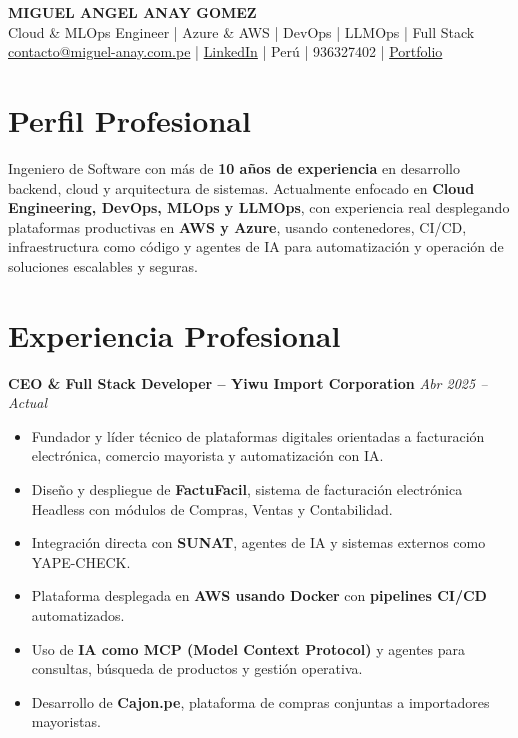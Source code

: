 \documentclass[11pt,a4paper]{article}
\begin{document}
\begin{center}
{\Large \textbf{MIGUEL ANGEL ANAY GOMEZ}}\\
Cloud \& MLOps Engineer | Azure \& AWS | DevOps | LLMOps | Full Stack\\
\vspace{4pt}
\href{mailto:contacto@miguel-anay.nom.pe}{contacto@miguel-anay.com.pe} |
\href{https://www.linkedin.com/in/miguel-anay}{LinkedIn} |
Perú
|
{936327402} |
\href{https:/portfolio.miguel-anay.nom.pe}{Portfolio} 
\end{center}

\vspace{6pt}

\section*{Perfil Profesional}

Ingeniero de Software con más de \textbf{10 años de experiencia} en desarrollo backend, cloud y arquitectura de sistemas.  
Actualmente enfocado en \textbf{Cloud Engineering, DevOps, MLOps y LLMOps}, con experiencia real desplegando plataformas productivas en \textbf{AWS y Azure}, usando contenedores, CI/CD, infraestructura como código y agentes de IA para automatización y operación de soluciones escalables y seguras.

\vspace{6pt}

\section*{Experiencia Profesional}

\textbf{CEO \& Full Stack Developer – Yiwu Import Corporation} \hfill \textit{Abr 2025 – Actual}
\begin{itemize}[leftmargin=*]
  \item Fundador y líder técnico de plataformas digitales orientadas a facturación electrónica, comercio mayorista y automatización con IA.
  \item Diseño y despliegue de \textbf{FactuFacil}, sistema de facturación electrónica Headless con módulos de Compras, Ventas y Contabilidad.
  \item Integración directa con \textbf{SUNAT}, agentes de IA y sistemas externos como YAPE-CHECK.
  \item Plataforma desplegada en \textbf{AWS usando Docker} con \textbf{pipelines CI/CD} automatizados.
  \item Uso de \textbf{IA como MCP (Model Context Protocol)} y agentes para consultas, búsqueda de productos y gestión operativa.
  \item Desarrollo de \textbf{Cajon.pe}, plataforma de compras conjuntas a importadores mayoristas.
\end{itemize}
\end{document}
